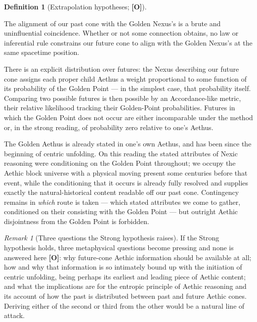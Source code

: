 \documentclass[11pt]{article}
\numberwithin{equation}{section}
\theoremstyle{plain}
\theoremstyle{definition}
\newtheorem{definition}[theorem]{Definition}
\theoremstyle{remark}
\newtheorem{remark}[theorem]{Remark}
\begin{document}
\begin{definition}[Extrapolation hypotheses; \textbf{[O]}]
\label{gc:def:extrapolation}
\begin{description}\itemsep3pt
\item[Void.] The alignment of our past cone with the Golden Nexus's is
a brute and uninfluential coincidence. Whether or not some connection
obtains, no law or inferential rule constrains our future cone to align
with the Golden Nexus's at the same spacetime position.

\item[Weak.] There is an explicit distribution over futures: the Nexus
describing our future cone assigns each proper child Aethus a weight
proportional to some function of its probability of the Golden Point ---
in the simplest case, that probability itself. Comparing two possible
futures is then possible by an Accordance-like metric, their relative
likelihood tracking their Golden-Point probabilities. Futures in which
the Golden Point does not occur are either incomparable under the
method or, in the strong reading, of probability zero relative to one's
Aethus.

\item[Strong.] The Golden Aethus is already stated in one's own Aethus,
and has been since the beginning of centric unfolding. On this reading
the stated attributes of Nexic reasoning were conditioning on the Golden
Point throughout; we occupy the Aethic block universe with a physical
moving present some centuries before that event, while the conditioning
that it occurs is already fully resolved and supplies exactly the
natural-historical content readable off our past cone. Contingency
remains in \emph{which} route is taken --- which stated attributes we
come to gather, conditioned on their consisting with the Golden Point
--- but outright Aethic disjointness from the Golden Point is
forbidden.
\end{description}
\end{definition}

\begin{remark}[Three questions the Strong hypothesis raises]
\label{gc:rem:strongquestions}
If the Strong hypothesis holds, three metaphysical questions become
pressing and none is answered here \textbf{[O]}: why future-cone Aethic
information should be available at all; how and why that information is
so intimately bound up with the initiation of centric unfolding, being
perhaps its earliest and leading piece of Aethic content; and what the
implications are for the entropic principle of Aethic reasoning and its
account of how the past is distributed between past and future Aethic
cones. Deriving either of the second or third from the other would be a
natural line of attack.
\end{remark}
\end{document}
